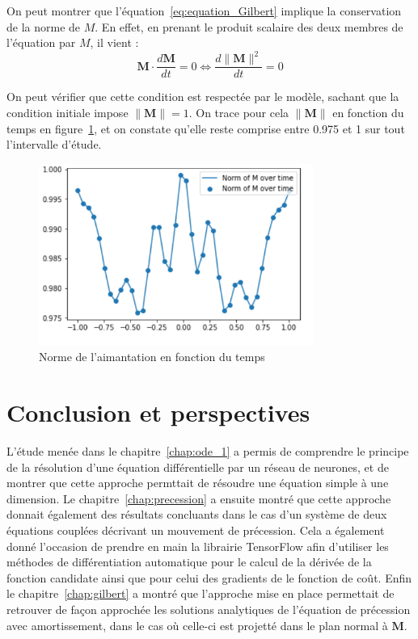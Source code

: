 \documentclass[12pt]{report}
\begin{document}
On peut montrer que l'équation~\ref{eq:equation_Gilbert} implique la conservation de la norme de $M$. 
En effet, en prenant le produit scalaire des deux membres de l'équation par $M$, il vient :
\begin{equation}
    \bm{M} \cdot \frac{d\bm{M}}{dt} = 0 \Leftrightarrow 
    \frac{d\lVert \bm{M} \rVert ^2}{dt} = 0 
\label{eq:conservation_norme_M}
\end{equation}

On peut vérifier que cette condition est respectée par le modèle, sachant que la condition initiale impose $\lVert \bm{M} \rVert=1$.
On trace pour cela $\lVert \bm{M} \rVert$ en fonction du temps en figure~\ref{fig:norme_de_M}, et on constate qu'elle reste comprise entre 0.975 et 1 sur tout l'intervalle d'étude.

\begin{figure}
    \centering
    \includegraphics[width=0.8\textwidth]{norm over time.PNG}
    \caption{Norme de l'aimantation en fonction du temps}
    \label{fig:norme_de_M}
\end{figure}


\chapter{Conclusion et perspectives}
\label{chap:conclusion}

L'étude menée dans le chapitre~\ref{chap:ode_1} a permis de comprendre le principe de la résolution d'une équation différentielle par un réseau de neurones, et de montrer que cette approche permttait de résoudre une équation simple à une dimension.
Le chapitre~\ref{chap:precession} a ensuite montré que cette approche donnait également des résultats concluants dans le cas d'un système de deux équations couplées décrivant un mouvement de précession.
Cela a également donné l'occasion de prendre en main la librairie TensorFlow afin d'utiliser les méthodes de différentiation automatique pour le calcul de la dérivée de la fonction candidate ainsi que pour celui des gradients de le fonction de coût.
Enfin le chapitre~\ref{chap:gilbert} a montré que l'approche mise en place permettait de retrouver de façon approchée les solutions analytiques de l'équation de précession avec amortissement, dans le cas où celle-ci est projetté dans le plan normal à $\bm M$.
\end{document}
